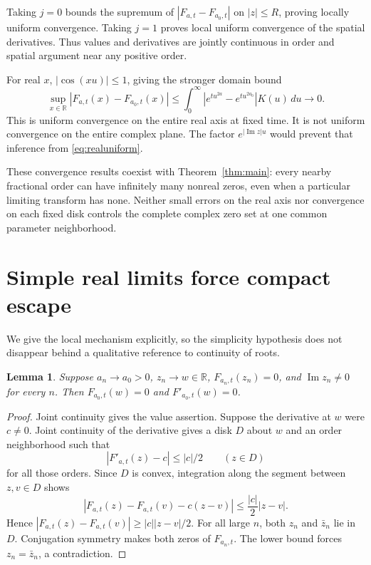 \documentclass[11pt]{article}
\newtheorem{lemma}[theorem]{Lemma}
\theoremstyle{remark}\newtheorem{remark}[theorem]{Remark}
\newcommand{\R}{\mathbb R}\newcommand{\C}{\mathbb C}
\begin{document}
Taking $j=0$ bounds the supremum of
$|F_{a,t}-F_{a_0,t}|$ on $|z|\leq R$, proving locally uniform
convergence. Taking $j=1$ proves local uniform convergence of the
spatial derivatives. Thus values and derivatives are jointly
continuous in order and spatial argument near any positive order.

For real $x$, $|\cos(xu)|\leq1$, giving the stronger domain bound
\begin{equation}\label{eq:realuniform}
 \sup_{x\in\R}|F_{a,t}(x)-F_{a_0,t}(x)|
 \leq\int_0^\infty
 |e^{tu^{2a}}-e^{tu^{2a_0}}|K(u)\,du\longrightarrow0.
\end{equation}
This is uniform convergence on the entire real axis at fixed time.
It is not uniform convergence on the entire complex plane. The
factor $e^{|\operatorname{Im}z|u}$ would prevent that inference
from \eqref{eq:realuniform}.

These convergence results coexist with Theorem~\ref{thm:main}:
every nearby fractional order can have infinitely many nonreal
zeros, even when a particular limiting transform has none. Neither
small errors on the real axis nor convergence on each fixed disk
controls the complete complex zero set at one common parameter
neighborhood.

\section{Simple real limits force compact escape}
We give the local mechanism explicitly, so the simplicity hypothesis
does not disappear behind a qualitative reference to continuity
of roots.

\begin{lemma}\label{lem:local}
Suppose $a_n\to a_0>0$, $z_n\to w\in\R$,
$F_{a_n,t}(z_n)=0$, and $\operatorname{Im}z_n\neq0$ for every $n$.
Then $F_{a_0,t}(w)=0$ and $F'_{a_0,t}(w)=0$.
\end{lemma}
\begin{proof}
Joint continuity gives the value assertion. Suppose the derivative
at $w$ were $c\neq0$. Joint continuity of the derivative gives a
disk $D$ about $w$ and an order neighborhood such that
\[
 |F'_{a,t}(z)-c|\leq|c|/2\qquad(z\in D)
\]
for all those orders. Since $D$ is convex, integration along the
segment between $z,v\in D$ shows
\[
 |F_{a,t}(z)-F_{a,t}(v)-c(z-v)|
 \leq\frac{|c|}{2}|z-v|.
\]
Hence $|F_{a,t}(z)-F_{a,t}(v)|\geq |c||z-v|/2$.
For all large $n$, both $z_n$ and $\bar z_n$ lie in $D$.
Conjugation symmetry makes both zeros of $F_{a_n,t}$.
The lower bound forces $z_n=\bar z_n$, a contradiction.
\end{proof}
\end{document}
